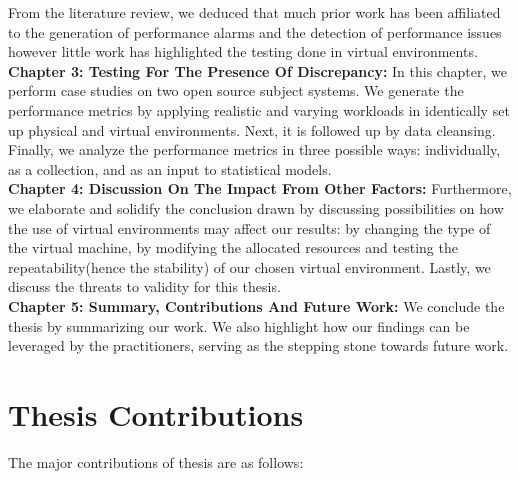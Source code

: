 From the literature review, we deduced that much prior work has been affiliated to the generation of performance alarms and the detection of performance issues however little work has highlighted the testing done in virtual environments.
\\

\noindent\textbf{Chapter 3: Testing For The Presence Of Discrepancy:} In this chapter, we perform case studies on two open source subject systems. We generate the performance metrics by applying realistic and varying workloads in identically set up physical and virtual environments. Next, it is followed up by data cleansing. Finally, we analyze the performance metrics in three possible ways: individually, as a collection, and as an input to statistical models. 
\\

\noindent\textbf{Chapter 4: Discussion On The Impact From Other Factors:}
Furthermore, we elaborate and solidify the conclusion drawn by discussing possibilities on how the use of virtual environments may affect our results: by changing the type of the virtual machine, by modifying the allocated resources and testing the repeatability(hence the stability) of our chosen virtual environment.
Lastly, we discuss the threats to validity for this thesis.
\\

\noindent\textbf{Chapter 5: Summary, Contributions And Future Work:}
We conclude the thesis by summarizing our work. We also highlight how our findings can be leveraged by the practitioners, serving as the stepping stone towards future work.  
\\



\section{Thesis Contributions}

The major contributions of thesis are as follows:

